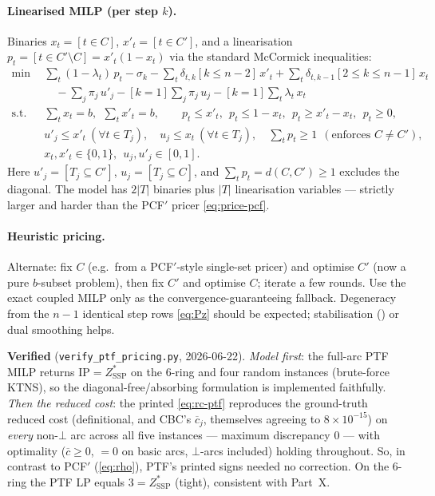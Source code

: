 \documentclass[11pt,a4paper]{article}
\theoremstyle{plain}
\theoremstyle{definition}
\newcommand{\ZSSP}{Z_{\mathrm{SSP}}^{*}}
\begin{document}
\paragraph{Linearised MILP (per step $k$).} Binaries $x_t=[t\in C]$, $x'_t=[t\in C']$, and a
linearisation $p_t=[t\in C'\setminus C]=x'_t(1-x_t)$ via the standard McCormick inequalities:
\begin{align*}
  \min\ \ & \sum_t (1-\lambda_t)\,p_t-\sigma_k-\sum_t\delta_{t,k}[k\le n-2]\,x'_t
    +\sum_t\delta_{t,k-1}[2\le k\le n-1]\,x_t\\
    &\quad-\sum_j\pi_j\,u'_j-[k=1]\sum_j\pi_j\,u_j-[k=1]\sum_t\lambda_t\,x_t\\
  \text{s.t.}\ \ & \textstyle\sum_t x_t=b,\ \ \sum_t x'_t=b,\qquad
    p_t\le x'_t,\ \ p_t\le 1-x_t,\ \ p_t\ge x'_t-x_t,\ \ p_t\ge0,\\
    & u'_j\le x'_t\ (\forall t\in T_j),\quad u_j\le x_t\ (\forall t\in T_j),\quad
    \textstyle\sum_t p_t\ge 1\ \ (\text{enforces }C\neq C'),\\
    & x_t,x'_t\in\{0,1\},\ \ u_j,u'_j\in[0,1].
\end{align*}
Here $u'_j=[T_j\subseteq C']$, $u_j=[T_j\subseteq C]$, and $\sum_t p_t=d(C,C')\ge1$ excludes the
diagonal. The model has $2|T|$ binaries plus $|T|$ linearisation variables --- strictly larger
and harder than the PCF$'$ pricer \eqref{eq:price-pcf}.

\paragraph{Heuristic pricing.} Alternate: fix $C$ (e.g.\ from a PCF$'$-style single-set pricer)
and optimise $C'$ (now a pure $b$-subset problem), then fix $C'$ and optimise $C$; iterate a few
rounds. Use the exact coupled MILP only as the convergence-guaranteeing fallback. Degeneracy from
the $n-1$ identical step rows \eqref{eq:Pz} should be expected; stabilisation
(\citealp{Lubbecke2005}) or dual smoothing helps.

\begin{warnbox}
\textbf{Verified} (\texttt{verify\_ptf\_pricing.py}, 2026-06-22). \emph{Model first}: the full-arc
PTF MILP returns $\mathrm{IP}=\ZSSP$ on the $6$-ring and four random instances (brute-force KTNS),
so the diagonal-free/absorbing formulation is implemented faithfully. \emph{Then the reduced
cost}: the printed \eqref{eq:rc-ptf} reproduces the ground-truth reduced cost (definitional, and
CBC's $\overline{c}_j$, themselves agreeing to $8\times10^{-15}$) on \emph{every} non-$\bot$ arc
across all five instances --- maximum discrepancy $0$ --- with optimality ($\overline{c}\ge0$,
$=0$ on basic arcs, $\bot$-arcs included) holding throughout. So, in contrast to PCF$'$
(\cref{eq:rho}), PTF's printed signs needed no correction. On the $6$-ring the PTF LP equals
$3=\ZSSP$ (tight), consistent with Part~X.
\end{warnbox}
\end{document}
